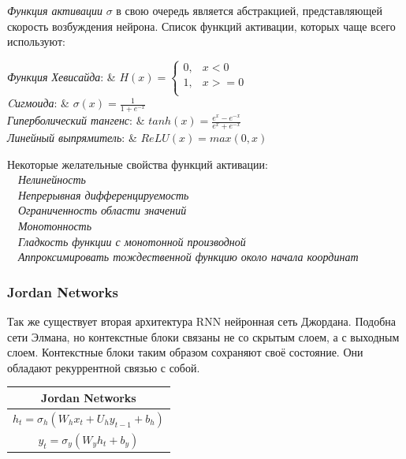 	\textit{Функция активации} $\sigma$ в свою очередь является абстракцией, представляющей скорость возбуждения нейрона. Список функций активации, которых чаще всего используют:
	
	\begin{tabbing}
			\textit{Функция Хевисайда}:       &   
			$ H(x) = 
			\begin{cases}
				0, & x < 0 \\
				1, & x >= 0 \\
			\end{cases}$ \\ 
			\textit{Cигмоида}:                &  $\sigma(x) = \frac{1}{1 + e^{-x}}$ \\ 
			\textit{Гиперболический тангенс}: &  $tanh(x) = \frac{e^x - e^{-x}}{e^x + e^{-x}}$ \\ 
			\textit{Линейный выпрямитель}:    &  $ReLU(x) = max(0, x)$ \\
	\end{tabbing}

	\begin{tabbing}
	    Некоторые желательные свойства функций активации:\\
		\ \ \textit{Нелинейность} \\
		\ \ \textit{Непрерывная дифференцируемость} \\
		\ \ \textit{Ограниченность области значений} \\
		\ \ \textit{Монотонность} \\
		\ \ \textit{Гладкость функции с монотонной производной} \\
		\ \ \textit{Аппроксимировать тождественной функцию около начала координат} \\
	\end{tabbing}
	
	\subsubsection{Jordan Networks}
    
    Так же существует вторая архитектура RNN нейронная сеть Джордана. Подобна сети Элмана, но контекстные блоки связаны не со скрытым слоем, а с выходным слоем. Контекстные блоки таким образом сохраняют своё состояние. Они обладают рекуррентной связью с собой.
    
	\begin{table}[h]
			\centering
			\begin{tabular}{|c|} 
				\hline
				\textbf{Jordan Networks}  \\ 
				\hline
				$	h_{t} = \sigma_{h}(W_h x_t + U_h y_{t - 1} + b_h) $  \\
				$	y_{t} = \sigma_{y}(W_y h_t + b_y) $ \\
				\hline
			\end{tabular}
	\end{table}
	
